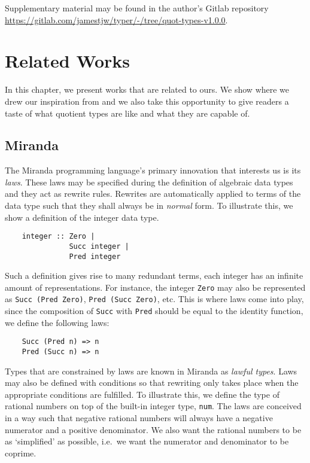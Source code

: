 \documentclass[12pt,twoside,maitrise]{dms}
\theoremstyle{definition}
\numberwithin{equation}{section}
\numberwithin{table}{chapter}
\numberwithin{figure}{chapter}
\newcommand\id[1] {\texttt{#1}}
\newcommand\fn[1] {\texttt{#1}}
\begin{document}
Supplementary material may be found in the author's Gitlab repository
\url{https://gitlab.com/jamestjw/typer/-/tree/quot-types-v1.0.0}.


\chapter{Related Works}

In this chapter, we present works that are related to ours. We show where we
drew our inspiration from and we also take this opportunity to give readers a
taste of what quotient types are like and what they are capable of.

\section{Miranda}

The Miranda programming language's\cite{thompson1986laws, thompson1990lawful}
primary innovation that interests us is its \emph{laws}. These laws may be
specified during the definition of algebraic data types and they act as rewrite
rules. Rewrites are automatically applied to terms of the data type such that
they shall always be in \emph{normal} form. To illustrate this, we show a
definition of the integer data type.

\begin{verbatim}
    integer :: Zero |
               Succ integer |
               Pred integer
\end{verbatim}

Such a definition gives rise to many redundant terms, each integer has an
infinite amount of representations. For instance, the integer \id{Zero} may also
be represented as \fn{Succ (Pred Zero)}, \fn{Pred (Succ Zero)}, etc. This is
where laws come into play, since the composition of \id{Succ} with \id{Pred}
should be equal to the identity function, we define the following laws:

\begin{verbatim}
    Succ (Pred n) => n
    Pred (Succ n) => n
\end{verbatim}

Types that are constrained by laws are known in Miranda as \emph{lawful types}.
Laws may also be defined with conditions so that rewriting only takes place when
the appropriate conditions are fulfilled. To illustrate this, we define the type
of rational numbers on top of the built-in integer type, \id{num}. The laws are
conceived in a way such that negative rational numbers will always have a
negative numerator and a positive denominator. We also want the rational numbers
to be as `simplified' as possible, i.e.\ we want the numerator and denominator
to be coprime.
\end{document}
